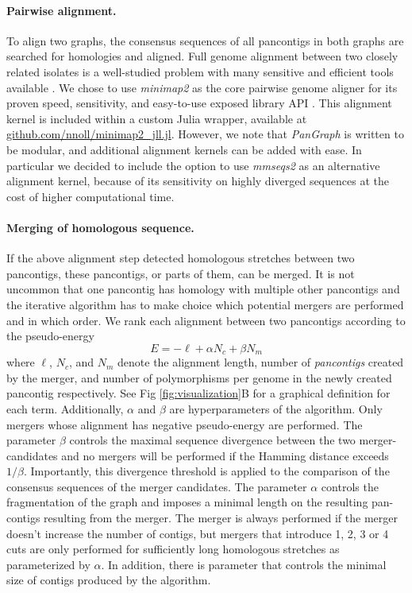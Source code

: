 \documentclass[aps,rmp,reprint,superscriptaddress,notitlepage,10pt]{revtex4-1}
\begin{document}
\paragraph*{Pairwise alignment.}
To align two graphs, the consensus sequences of all pancontigs in both graphs are searched for homologies and aligned.
Full genome alignment between two closely related isolates is a well-studied problem with many sensitive and efficient tools available \cite{li2018minimap2,marccais2018mummer4}.
We chose to use \emph{minimap2} as the core pairwise genome aligner for its proven speed, sensitivity, and easy-to-use exposed library API \cite{li2018minimap2}.
This alignment kernel is included within a custom Julia wrapper, available at \url{github.com/nnoll/minimap2_jll.jl}.
However, we note that \emph{PanGraph} is written to be modular, and additional alignment kernels can be added with ease.
In particular we decided to include the option to use \emph{mmseqs2} \cite{steinegger2017mmseqs2} as an alternative alignment kernel, because of its sensitivity on highly diverged sequences at the cost of higher computational time.

\paragraph*{Merging of homologous sequence.}
If the above alignment step detected homologous stretches between two pancontigs, these pancontigs, or parts of them, can be merged.
It is not uncommon that one pancontig has homology with multiple other pancontigs and the iterative algorithm has to make choice which potential mergers are performed and in which order.
We rank each alignment between two pancontigs according to the pseudo-energy
\begin{equation}\label{eq:pseudo-energy}
    E = -\ell + \alpha N_c + \beta N_m
\end{equation}
where $\ell$, $N_c$, and $N_m$ denote the alignment length, number of \emph{pancontigs} created by the merger, and number of polymorphisms per genome in the newly created {pancontig} respectively.
See Fig \ref{fig:visualization}B for a graphical definition for each term.
Additionally, $\alpha$ and $\beta$ are hyperparameters of the algorithm.
Only mergers whose alignment has negative pseudo-energy are performed.
The parameter $\beta$ controls the maximal sequence divergence between the two merger-candidates and no mergers will be performed if the Hamming distance exceeds $1/\beta$.
Importantly, this divergence threshold is applied to the comparison of the consensus sequences of the merger candidates.
The parameter $\alpha$ controls the fragmentation of the graph and imposes a minimal length on the resulting pan-contigs resulting from the merger.
The merger is always performed if the merger doesn't increase the number of contigs, but mergers that introduce 1, 2, 3 or 4 cuts are only performed for sufficiently long homologous stretches as parameterized by $\alpha$.
In addition, there is parameter that controls the minimal size of contigs produced by the algorithm.
\end{document}

